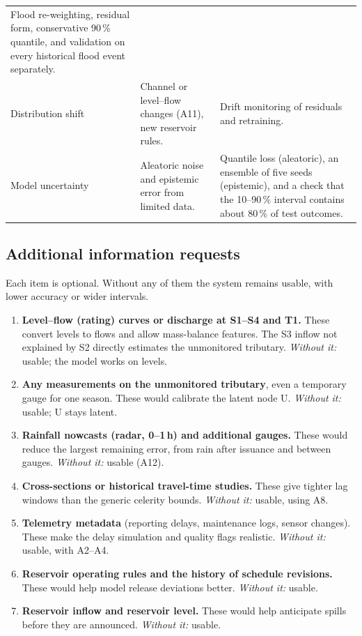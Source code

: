\begin{table}[H]
\begin{tabularx}{\textwidth}{@{}p{2.9cm}XX@{}}
Flood re-weighting, residual form, conservative 90\,\% quantile, and validation on every historical
flood event separately.\\
Distribution shift &
Channel or level--flow changes (A11), new reservoir rules. &
Drift monitoring of residuals and retraining.\\
Model uncertainty &
Aleatoric noise and epistemic error from limited data. &
Quantile loss (aleatoric), an ensemble of five seeds (epistemic), and a check that the 10--90\,\%
interval contains about 80\,\% of test outcomes.\\
\bottomrule
\end{tabularx}
\end{table}

\subsection*{Additional information requests}
Each item is optional. Without any of them the system remains usable, with lower accuracy or wider
intervals.
\begin{enumerate}[leftmargin=*,itemsep=2pt]
\item \textbf{Level--flow (rating) curves or discharge at S1--S4 and T1.} These convert levels to
flows and allow mass-balance features. The S3 inflow not explained by S2 directly estimates the
unmonitored tributary. \emph{Without it:} usable; the model works on levels.
\item \textbf{Any measurements on the unmonitored tributary}, even a temporary gauge for one season.
These would calibrate the latent node U. \emph{Without it:} usable; U stays latent.
\item \textbf{Rainfall nowcasts (radar, 0--1\,h) and additional gauges.} These would reduce the
largest remaining error, from rain after issuance and between gauges. \emph{Without it:} usable (A12).
\item \textbf{Cross-sections or historical travel-time studies.} These give tighter lag windows
than the generic celerity bounds. \emph{Without it:} usable, using A8.
\item \textbf{Telemetry metadata} (reporting delays, maintenance logs, sensor changes). These make
the delay simulation and quality flags realistic. \emph{Without it:} usable, with A2--A4.
\item \textbf{Reservoir operating rules and the history of schedule revisions.} These would help
model release deviations better. \emph{Without it:} usable.
\item \textbf{Reservoir inflow and reservoir level.} These would help anticipate spills before they
are announced. \emph{Without it:} usable.
\end{enumerate}

